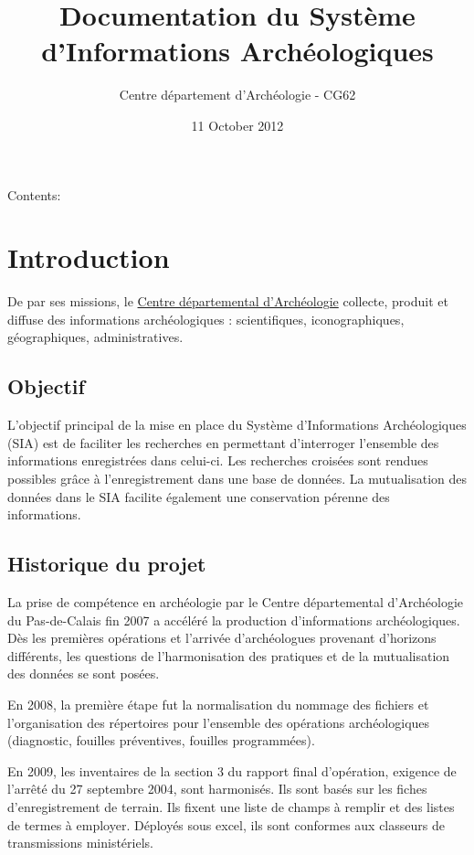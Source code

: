 \documentclass[letterpaper,10pt,french]{sphinxmanual}
\title{Documentation du Système d'Informations Archéologiques}
\date{11 October 2012}
\author{Centre département d'Archéologie - CG62}
\begin{document}
\maketitle
\tableofcontents
{}\label{index::doc}


Contents:


\chapter{Introduction}
\label{manuel/intro:introduction}\label{manuel/intro::doc}\label{manuel/intro:manuel-du-systeme-d-informations-archeologiques}
De par ses missions, le \href{http://archeologie.pasdecalais.fr/}{Centre départemental d’Archéologie} collecte, produit et diffuse des informations archéologiques : scientifiques, iconographiques, géographiques, administratives.


\section{Objectif}
\label{manuel/intro:objectif}
L’objectif principal de la mise en place du Système d’Informations Archéologiques (SIA) est de faciliter les recherches en permettant d’interroger l’ensemble des informations enregistrées dans celui-ci. Les recherches croisées sont rendues possibles grâce à l’enregistrement dans une base de données. La mutualisation des données dans le SIA facilite également une conservation pérenne des informations.


\section{Historique du projet}
\label{manuel/intro:historique-du-projet}
La prise de compétence en archéologie par le Centre départemental d’Archéologie du Pas-de-Calais fin 2007 a accéléré la production d’informations archéologiques. Dès les premières opérations et l’arrivée d’archéologues provenant d’horizons différents, les questions de l’harmonisation des pratiques et de la mutualisation des données se sont posées.

En 2008, la première étape fut la normalisation du nommage des fichiers et l’organisation des répertoires pour l’ensemble des opérations archéologiques (diagnostic, fouilles préventives, fouilles programmées).

En 2009, les inventaires de la section 3 du rapport final d’opération, exigence de l’arrêté du 27 septembre 2004, sont harmonisés. Ils sont basés sur les fiches d’enregistrement de terrain. Ils fixent une liste de champs à remplir et des listes de termes à employer. Déployés sous excel, ils sont conformes aux classeurs de transmissions ministériels.
\end{document}
